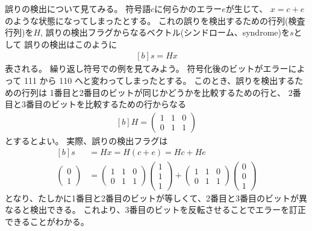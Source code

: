 \documentclass[../master.tex]{subfiles}
\begin{document}
誤りの検出について見てみる。
符号語\(c\)に何らかのエラー\(e\)が生じて、
\(x=c+e\)のような状態になってしまったとする。
これの誤りを検出するための行列(検査行列)を\(H\),
誤りの検出フラグからなるベクトル(シンドローム、syndrome)を\(s\)として
誤りの検出はこのように
\begin{equation}\begin{aligned}[b]
    s = Hx
\end{aligned}\end{equation}
表される。
繰り返し符号での例を見てみよう。
符号化後のビットがエラーによって 111 から 110 へと変わってしまったとする。
このとき、誤りを検出するための行列は
1番目と2番目のビットが同じかどうかを比較するための行と、
2番目と3番目のビットを比較するための行からなる
\begin{equation}\begin{aligned}[b]
    H = \begin{pmatrix}
        1 & 1 & 0\\
        0 & 1 & 1
    \end{pmatrix}
\end{aligned}\end{equation}
とするとよい。
実際、誤りの検出フラグは
\begin{equation}\begin{aligned}[b]
    s &= Hx=H(c+e)=Hc+He\\
    \begin{pmatrix}
        0 \\ 1
    \end{pmatrix}
    &= \begin{pmatrix}
        1 & 1 & 0\\
        0 & 1 & 1
    \end{pmatrix}\begin{pmatrix}
        1 \\1\\1
    \end{pmatrix}+
    \begin{pmatrix}
        1 & 1 & 0\\
        0 & 1 & 1
    \end{pmatrix}\begin{pmatrix}
        0 \\0\\1
    \end{pmatrix}
\end{aligned}\end{equation}
となり、たしかに1番目と2番目のビットが等しくて、2番目と3番目のビットが異なると検出できる。
これより、3番目のビットを反転させることでエラーを訂正できることがわかる。
\end{document}
